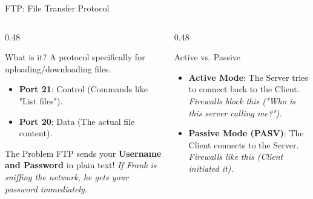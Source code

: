 \documentclass[aspectratio=169]{beamer}  %
\begin{document}
\begin{frame}{FTP: File Transfer Protocol}
    \begin{columns}[T]
        \begin{column}{0.48\textwidth}
            \begin{block}{What is it?}
                \small
                A protocol specifically for uploading/downloading files.
                \begin{itemize}
                    \item \textbf{Port 21}: Control (Commands like "List files").
                    \item \textbf{Port 20}: Data (The actual file content).
                \end{itemize}
            \end{block}
            \begin{alertblock}{The Problem}
                \small
                FTP sends your \textbf{Username and Password} in plain text!
                \textit{If Frank is sniffing the network, he gets your password immediately.}
            \end{alertblock}
        \end{column}
        \begin{column}{0.48\textwidth}
            \begin{block}{Active vs. Passive}
                \footnotesize
                \begin{itemize}
                    \item \textbf{Active Mode}: The Server tries to connect back to the Client.
                    \textit{Firewalls block this ("Who is this server calling me?").}
                    \item \textbf{Passive Mode (PASV)}: The Client connects to the Server.
                    \textit{Firewalls like this (Client initiated it).}
                \end{itemize}
            \end{block}
            \begin{center}
            \end{center}
        \end{column}
    \end{columns}
\end{frame}
\end{document}
